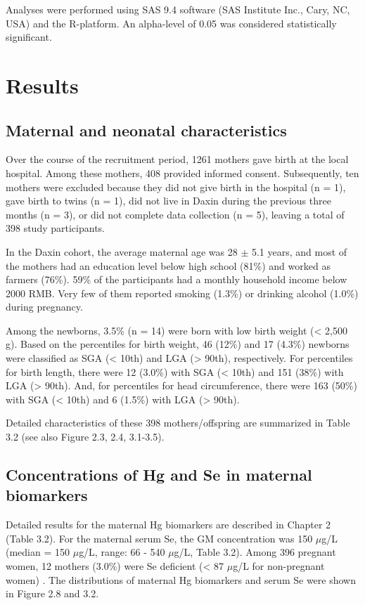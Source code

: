 Analyses were performed using SAS 9.4 software (SAS Institute Inc., Cary, NC, USA) and the R-platform. An alpha-level of 0.05 was considered statistically significant.

\section{Results}

\subsection{Maternal and neonatal characteristics}

Over the course of the recruitment period, 1261 mothers gave birth at the local hospital. Among these mothers, 408 provided informed consent. Subsequently, ten mothers were excluded because they did not give birth in the hospital (n = 1), gave birth to twins (n = 1), did not live in Daxin during the previous three months (n = 3), or did not complete data collection (n = 5), leaving a total of 398 study participants. 

In the Daxin cohort, the average maternal age was 28 ${\pm}$ 5.1 years, and most of the mothers had an education level below high school (81\%) and worked as farmers (76\%). 59\% of the participants had a monthly household income below 2000 RMB. Very few of them reported smoking (1.3\%) or drinking alcohol (1.0\%) during pregnancy. 

Among the newborns, 3.5\% (n = 14) were born with low birth weight (< 2,500 g). Based on the percentiles for birth weight, 46 (12\%) and 17 (4.3\%) newborns were classified as SGA (< 10th) and LGA (> 90th), respectively. For percentiles for birth length, there were 12 (3.0\%) with SGA (< 10th) and 151 (38\%) with LGA (> 90th). And, for percentiles for head circumference, there were 163 (50\%) with SGA (< 10th) and 6 (1.5\%) with LGA (> 90th).

Detailed characteristics of these 398 mothers/offspring are summarized in Table 3.2 (see also Figure 2.3, 2.4, 3.1-3.5).

\subsection{Concentrations of Hg and Se in maternal biomarkers}

Detailed results for the maternal Hg biomarkers are described in Chapter 2 (Table 3.2). For the maternal serum Se, the GM concentration was 150 ${\mu}$g/L (median = 150 ${\mu}$g/L, range: 66 - 540 ${\mu}$g/L, Table 3.2). Among 396 pregnant women, 12 mothers (3.0\%) were Se deficient (< 87 ${\mu}$g/L for non-pregnant women) \citep{who2006guidelines}. The distributions of maternal Hg biomarkers and serum Se were shown in Figure 2.8 and 3.2.

